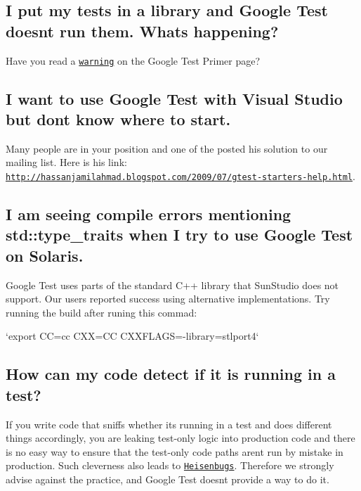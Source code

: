 \subsection*{I put my tests in a library and Google Test doesn\textquotesingle{}t run them. What\textquotesingle{}s happening?}

Have you read a \href{V1_7_Primer.md#important-note-for-visual-c-users}{\tt warning} on the Google Test Primer page?

\subsection*{I want to use Google Test with Visual Studio but don\textquotesingle{}t know where to start.}

Many people are in your position and one of the posted his solution to our mailing list. Here is his link\+: \href{http://hassanjamilahmad.blogspot.com/2009/07/gtest-starters-help.html}{\tt http\+://hassanjamilahmad.\+blogspot.\+com/2009/07/gtest-\/starters-\/help.\+html}.

\subsection*{I am seeing compile errors mentioning std\+::type\+\_\+traits when I try to use Google Test on Solaris.}

Google Test uses parts of the standard C++ library that Sun\+Studio does not support. Our users reported success using alternative implementations. Try running the build after runing this commad\+:

`export CC=cc C\+XX=CC C\+X\+X\+F\+L\+A\+GS=\textquotesingle{}-\/library=stlport4\textquotesingle{}`

\subsection*{How can my code detect if it is running in a test?}

If you write code that sniffs whether it\textquotesingle{}s running in a test and does different things accordingly, you are leaking test-\/only logic into production code and there is no easy way to ensure that the test-\/only code paths aren\textquotesingle{}t run by mistake in production. Such cleverness also leads to \href{http://en.wikipedia.org/wiki/Unusual_software_bug#Heisenbug}{\tt Heisenbugs}. Therefore we strongly advise against the practice, and Google Test doesn\textquotesingle{}t provide a way to do it.

